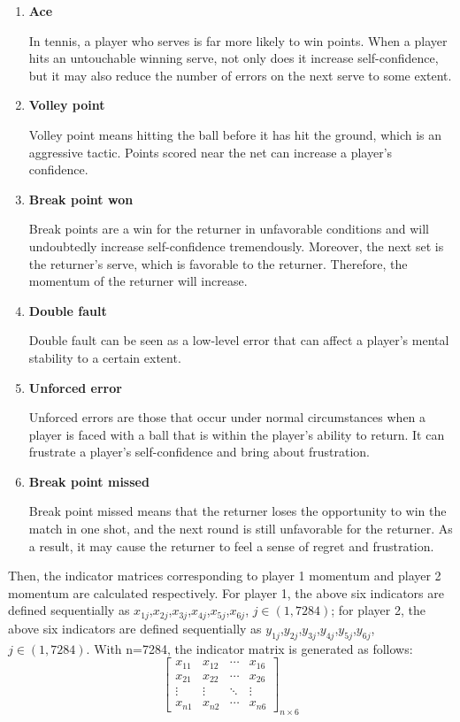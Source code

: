 \documentclass[12pt]{article}  %
\begin{document}
\begin{enumerate}[\bfseries 1.]
	\setlength{\parsep}{0ex} %
	\setlength{\topsep}{0.5pt} %
	\setlength{\itemsep}{0.5pt} %
	\item \textbf{Ace}
	
	In tennis, a player who serves is far more likely to win points. When a player hits an untouchable winning serve, not only does it increase self-confidence, but it may also reduce the number of errors on the next serve to some extent.
	\item \textbf{Volley point}
	
	Volley point means hitting the ball before it has hit the ground, which is an aggressive tactic. Points scored near the net can increase a player's confidence.
	\item \textbf{Break point won}
	
	Break points are a win for the returner in unfavorable conditions and will undoubtedly increase self-confidence tremendously. Moreover, the next set is the returner's serve, which is favorable to the returner. Therefore, the momentum of the returner will increase.
	\item \textbf{Double fault}
	
	Double fault can be seen as a low-level error that can affect a player's mental stability to a certain extent.
	\item \textbf{Unforced error}
	
	Unforced errors are those that occur under normal circumstances when a player is faced with a ball that is within the player's ability to return. It can frustrate a player's self-confidence and bring about frustration.
	\item \textbf{Break point missed}
	
	Break point missed means that the returner loses the opportunity to win the match in one shot, and the next round is still unfavorable for the returner. As a result, it may cause the returner to feel a sense of regret and frustration.
\end{enumerate}

Then, the indicator matrices corresponding to player 1 momentum and player 2 momentum are calculated respectively. For player 1, the above six indicators are defined sequentially as $x_{1j}$,$x_{2j}$,$x_{3j}$,$x_{4j}$,$x_{5j}$,$x_{6j}$, $j \in(1,7284)$; for player 2, the above six indicators are defined sequentially as $y_{1j}$,$y_{2j}$,$y_{3j}$,$y_{4j}$,$y_{5j}$,$y_{6j}$, $j \in(1,7284)$. With n=7284, the indicator matrix is generated as follows:
\begin{equation}
	\left[\begin{array}{cccc}
		x_{11} & x_{12} & \cdots & x_{16} \\
		x_{21} & x_{22} & \cdots & x_{26} \\
		\vdots & \vdots & \ddots & \vdots \\
		x_{n 1} & x_{n 2} & \cdots & x_{n 6}
	\end{array}\right]_{n \times 6}
\end{equation}
\end{document}
